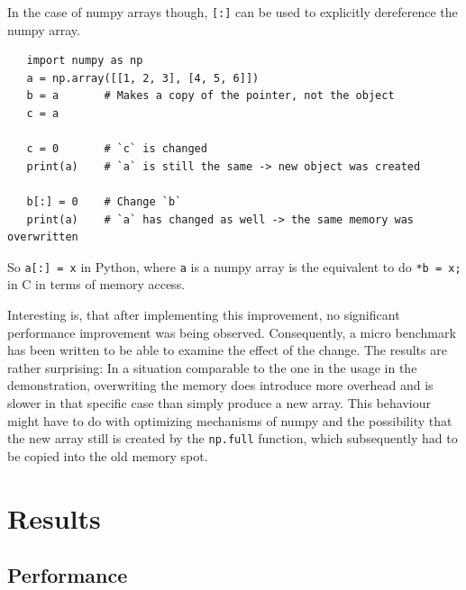 \documentclass[12pt, a4paper, titlepage]{report}
\begin{document}
In the case of numpy arrays though, \lstinline{[:]} can be used to explicitly dereference the numpy array.

\begin{lstlisting}
   import numpy as np
   a = np.array([[1, 2, 3], [4, 5, 6]])
   b = a       # Makes a copy of the pointer, not the object
   c = a

   c = 0       # `c` is changed
   print(a)    # `a` is still the same -> new object was created

   b[:] = 0    # Change `b`
   print(a)    # `a` has changed as well -> the same memory was overwritten
\end{lstlisting}

So \lstinline{a[:] = x} in Python, where \lstinline{a} is a numpy array is the equivalent to do \lstinline{*b = x;} in C in terms of memory access.

Interesting is, that after implementing this improvement, no significant performance improvement was being observed. Consequently, a micro benchmark has been written to be able to examine the effect of the change. The results are rather surprising: In a situation comparable to the one in the usage in the demonstration, overwriting the memory does introduce more overhead and is slower in that specific case than simply produce a new array. This behaviour might have to do with optimizing mechanisms of numpy and the possibility that the new array still is created by the \lstinline{np.full} function, which subsequently had to be copied into the old memory spot.




\chapter{Results}

\section{Performance}



\end{document}
